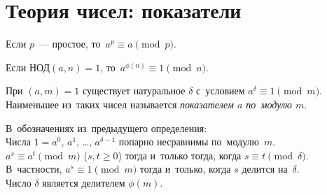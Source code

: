 \section*{Теория чисел: показатели}



\begingroup\providecommand\ifincludesolutions{\iffalse}

\ifincludesolutions
\subsection*{Версия с решениями}
\fi

Если $p$~--- простое, то~$a^p \equiv a \pmod{p}$.

Если $\text{НОД}(a, n) = 1$, то~$a^{\phi(n)} \equiv 1 \pmod{n}$.

При $(a, m) = 1$ существует натуральное $\delta$ с~условием
$a^{\delta} \equiv 1 \pmod{m}$.
Наименьшее из~таких чисел называется \emph{показателем $a$ по~модулю $m$}.

\begin{problems}

\item
В~обозначениях из~предыдущего определения:
\\
\sp
Числа $1 = a^0$, $a^1$, \ldots, $a^{\delta-1}$ попарно несравнимы
по~модулю~$m$.
\\
\sp
$a^s \equiv a^t \pmod{m}$ ($s, t \geq 0$)
тогда и~только тогда, когда
$s \equiv t \pmod{\delta}$.
В~частности, $a^s \equiv 1 \pmod{m}$
тогда и~только, когда
$s$ делится на~$\delta$.
\\
\sp\label{extra/algebra:phi:problem}%
Число $\delta$ является делителем $\phi(m)$.

\end{problems}

\ifincludesolutions
\setcounter{jeolmsubproblem}{0}%
\sp
Пусть $a^s \equiv a^t \pmod{m}$.
Тогда $a^{t} (a^{s-t} - 1)$ делится на~$m$.
То есть $(a^{s-t} - 1)$ делится на~$m$.
Но~такого быть не~может, поскольку $0 < s - t < \delta$.
\par
\sp
Сначала докажем, что $a^s \equiv 1 \pmod{m}$ тогда и только тогда, когда
$s$ делится на~$\delta$.
Пусть это не~так.
Тогда $s = x \delta + r$.
Имеем, $1 \equiv a^s \equiv (a^{\delta})^x a^r \equiv a^r \pmod{m}$.
Но~такого быть не~может из~определения показателя.
Значит, $r = 0$ и~$s$ делится на~$\delta$ без остатка.
Отсюда сразу следует, что если $a^s \equiv a^t \pmod{m}$, то~$(a^{s-t} - 1)$
делится на~$m$, то~есть $(s - t)$ делится на~$\delta$.
\par
\sp
Очевидное следствие из~теоремы Эйлера и~предыдущего пункта.
\fi %

